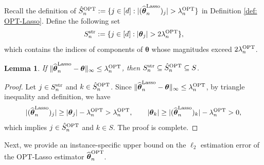 \documentclass[aos,preprint]{imsart}
\theoremstyle{plain}
\newtheorem{lemma}[theorem]{Lemma}
\theoremstyle{definition}
\newtheorem{definition}{Definition}
\newcommand{\btheta}{\boldsymbol{\theta}}
\newcommand{\hbtheta}{\widehat{\boldsymbol{\theta}}}
\newcommand{\bX}{\boldsymbol{X}}
\newcommand{\ltheta}{\hbtheta^{\textup{Lasso}}}
\newcommand{\hdtheta}{\hat{\theta}^{\textup{hard}}}
\newcommand{\hdbtheta}{\hat{\boldsymbol{\theta}}^{\textup{hard}}}
\newcommand{\ptheta}{\widehat{\boldsymbol{\theta}}^{\textup{OPT}}}
\newcommand{\bY}{\boldsymbol{Y}}
\newcommand{\hdlambda}{\lambda^{\textup{OPT}}}
\newcommand{\bZ}{\boldsymbol{Z}}
\newcommand{\pS}{\hat{S}^{\textup{OPT}}}
\newcommand{\hdS}{\hat{S}^{\textup{OPT}}}
\begin{document}
\begin{appendix}

Recall the definition of $\pS_n:= \{j \in [d]: |(\ltheta_n)_j| > \hdlambda_n\}$ in Definition \ref{def: OPT-Lasso}. Define the following set
$$S_n^{\textup{str}}:=\{j\in [d]: |\btheta_j| > 2\hdlambda_n\},$$
which contains the indices of components of $\btheta$ whose magnitudes exceed $2\hdlambda_n$.



\begin{lemma}
\label{lemma: threshold Lasso_ell_infty bound bandit}
If $\|\ltheta_n-\btheta\|_{\infty} \le \hdlambda_n$, then $S_n^{\textup{str}}\subseteq \hdS_n\subseteq S$.
\end{lemma}
\begin{proof}
Let $j \in  S_n^{\textup{str}}$ and $k \in \hdS_n$. Since $\|\ltheta_n-\btheta\|_{\infty} \le \hdlambda_n$, by triangle inequality and definition, we have
$$
|(\ltheta_n)_j| \geq |\btheta_j| - \hdlambda_n > \hdlambda_n, \qquad
|\btheta_k| \geq  |(\ltheta_n)_k| - \hdlambda_n > 0,
$$
which implies $j \in \hdS_n$ and $k \in S$. The proof is complete.
\end{proof}



Next, we provide an instance-specific upper bound on the $\ell_2$ estimation error of the OPT-Lasso estimator $\ptheta_n$.


\end{appendix}
\end{document}
